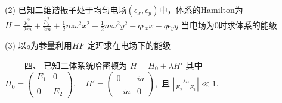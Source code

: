 (2) 已知二维谐振子处于均匀电场$(\epsilon_x, \epsilon_y)$中，体系的Hamilton为 
$H = \frac{p_x^2}{2m} + \frac{p_y^2}{2m} + \frac{1}{2}m\omega^2 x^2 + \frac{1}{2}m\omega^2 y^2 - q\epsilon_x x - q\epsilon_y y$
当电场为0时求体系的能级

(3) 以$q$为参量利用$HF$ 定理求在电场下的能级

　　 四、
已知二体系统哈密顿为 
$H = H_0 + \lambda H'$
其中
$H_0 = \begin{pmatrix}E_1 & 0 \\\\0 & E_2\end{pmatrix}, \quad H' = \begin{pmatrix}0 & ia \\\\-ia & 0\end{pmatrix},$
且 $\left|\frac{\lambda a}{E_2 - E_1}\right| \ll 1$.

